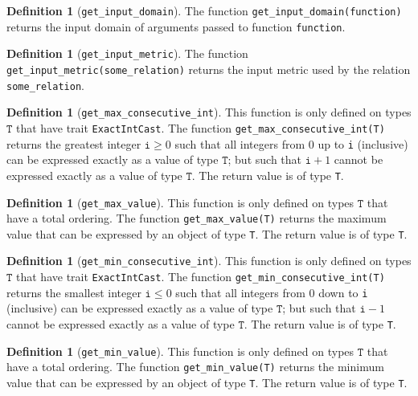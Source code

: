 \documentclass[11pt,a4paper]{article}
\theoremstyle{definition}
\newtheorem{definition}[theorem]{Definition}
\newcommand{\T}{\texttt{T}}
\begin{document}
\begin{definition}[\texttt{get\_input\_domain}]
    The function \texttt{get\_input\_domain(function)} returns the input domain of arguments passed to function \texttt{function}.
\end{definition}

\begin{definition}[\texttt{get\_input\_metric}]
    The function \texttt{get\_input\_metric(some\_relation)} returns the input metric used by the relation \texttt{some\_relation}.
\end{definition}

\begin{definition}[\texttt{get\_max\_consecutive\_int}]
    This function is only defined on types $\T$ that have trait \texttt{ExactIntCast}. The function \texttt{get\_max\_consecutive\_int(T)} returns the greatest integer $\texttt{i}\geq 0$ such that all integers from 0 up to \texttt{i} (inclusive) can be expressed exactly as a value of type $\T$; but such that $\texttt{i}+1$ cannot be expressed exactly as a value of type $\T$. The return value is of type \texttt{T}.
\end{definition}

\begin{definition}[\texttt{get\_max\_value}]
    This function is only defined on types $\T$ that have a total ordering. The function \texttt{get\_max\_value(T)} returns the maximum value that can be expressed by an object of type \texttt{T}. The return value is of type \texttt{T}.
\end{definition}

\begin{definition}[\texttt{get\_min\_consecutive\_int}]
    This function is only defined on types $\T$ that have trait \texttt{ExactIntCast}. The function \texttt{get\_min\_consecutive\_int(T)} returns the smallest integer $\texttt{i}\leq 0$ such that all integers from 0 down to \texttt{i} (inclusive) can be expressed exactly as a value of type $\T$; but such that $\texttt{i}-1$ cannot be expressed exactly as a value of type $\T$. The return value is of type \texttt{T}.
\end{definition}

\begin{definition}[\texttt{get\_min\_value}]
    This function is only defined on types $\T$ that have a total ordering. The function \texttt{get\_min\_value(T)} returns the minimum value that can be expressed by an object of type \texttt{T}. The return value is of type \texttt{T}.
\end{definition}
\end{document}
